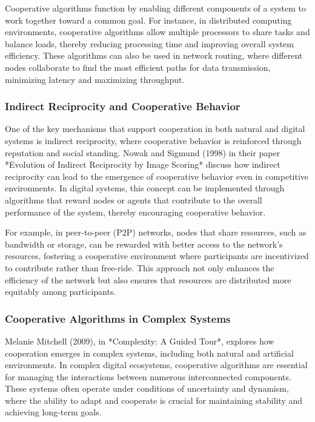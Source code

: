 \documentclass[12pt,twoside]{article}
\begin{document}
Cooperative algorithms function by enabling different components of a system to work together toward a common goal. For instance, in distributed computing environments, cooperative algorithms allow multiple processors to share tasks and balance loads, thereby reducing processing time and improving overall system efficiency. These algorithms can also be used in network routing, where different nodes collaborate to find the most efficient paths for data transmission, minimizing latency and maximizing throughput.

\subsubsection{Indirect Reciprocity and Cooperative Behavior}

One of the key mechanisms that support cooperation in both natural and digital systems is indirect reciprocity, where cooperative behavior is reinforced through reputation and social standing. Nowak and Sigmund (1998) in their paper *Evolution of Indirect Reciprocity by Image Scoring* discuss how indirect reciprocity can lead to the emergence of cooperative behavior even in competitive environments. In digital systems, this concept can be implemented through algorithms that reward nodes or agents that contribute to the overall performance of the system, thereby encouraging cooperative behavior.

For example, in peer-to-peer (P2P) networks, nodes that share resources, such as bandwidth or storage, can be rewarded with better access to the network’s resources, fostering a cooperative environment where participants are incentivized to contribute rather than free-ride. This approach not only enhances the efficiency of the network but also ensures that resources are distributed more equitably among participants.

\subsubsection{Cooperative Algorithms in Complex Systems}

Melanie Mitchell (2009), in *Complexity: A Guided Tour*, explores how cooperation emerges in complex systems, including both natural and artificial environments. In complex digital ecosystems, cooperative algorithms are essential for managing the interactions between numerous interconnected components. These systems often operate under conditions of uncertainty and dynamism, where the ability to adapt and cooperate is crucial for maintaining stability and achieving long-term goals.
\end{document}
